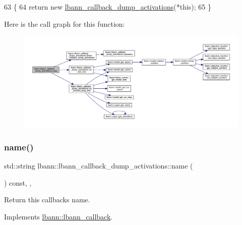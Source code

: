 \begin{DoxyCode}
63                                                          \{
64     \textcolor{keywordflow}{return} \textcolor{keyword}{new} \hyperlink{classlbann_1_1lbann__callback__dump__activations_a96d1412d4b29cab747bb0c1cfccd8a87}{lbann\_callback\_dump\_activations}(*\textcolor{keyword}{this});
65   \}
\end{DoxyCode}
Here is the call graph for this function\+:\nopagebreak
\begin{figure}[H]
\begin{center}
\leavevmode
\includegraphics[width=350pt]{classlbann_1_1lbann__callback__dump__activations_a172d03a30d8c8852d910db220b928557_cgraph}
\end{center}
\end{figure}
\mbox{\label{classlbann_1_1lbann__callback__dump__activations_adc6a741a2ef667a5969ddbb8ec159163}} 
\subsubsection{\texorpdfstring{name()}{name()}}
{\footnotesize\ttfamily std\+::string lbann\+::lbann\+\_\+callback\+\_\+dump\+\_\+activations\+::name (\begin{DoxyParamCaption}{ }\end{DoxyParamCaption}) const\hspace{0.3cm}{\ttfamily [inline]}, {\ttfamily [override]}, {\ttfamily [virtual]}}

Return this callback\textquotesingle{}s name. 

Implements \hyperlink{classlbann_1_1lbann__callback_a7522c7a14f1d6a1ea762cc2d7248eb3a}{lbann\+::lbann\+\_\+callback}.



